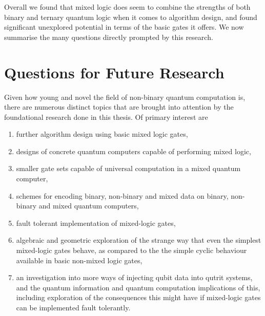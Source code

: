 Overall we found that mixed logic does seem to combine the strengths of both binary and ternary quantum logic when it comes to algorithm design, and found significant unexplored potential in terms of the basic gates it offers. We now summarise the many questions directly prompted by this research.

\section{Questions for Future Research}

Given how young and novel the field of non-binary quantum computation is, there are numerous distinct topics that are brought into attention by the foundational research done in this thesis. Of primary interest are
\begin{enumerate}
	\item further algorithm design using basic mixed logic gates,
	\item designs of concrete quantum computers capable of performing mixed logic,
	\item smaller gate sets capable of universal computation in a mixed quantum computer,
	\item schemes for encoding binary, non-binary and mixed data on binary, non-binary and mixed quantum computers,
	\item fault tolerant implementation of mixed-logic gates,
	\item algebraic and geometric exploration of the strange way that even the simplest mixed-logic gates behave, as compared to the the simple cyclic behaviour available in basic non-mixed logic gates,
	\item an investigation into more ways of injecting qubit data into qutrit systems, and the quantum information and quantum computation implications of this, including exploration of the consequences this might have if mixed-logic gates can be implemented fault tolerantly.
\end{enumerate}

